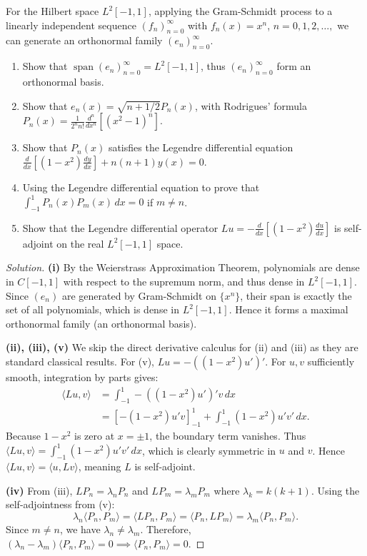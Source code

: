 \documentclass{article}
\begin{document}
	\begin{problem}
		For the Hilbert space $L^{2}[-1,1]$, applying the Gram-Schmidt process to a linearly independent sequence $(f_{n})_{n=0}^{\infty}$ with $f_{n}(x) = x^{n}$, $n=0,1,2,\dots,$ we can generate an orthonormal family $(e_{n})_{n=0}^{\infty}$.
		\begin{enumerate}
			\item[(i)] Show that $\operatorname{span}(e_{n})_{n=0}^{\infty} = L^{2}[-1,1]$, thus $(e_{n})_{n=0}^{\infty}$ form an orthonormal basis.
			\item[(ii)] Show that $e_{n}(x) = \sqrt{n + 1/2} P_{n}(x)$, with Rodrigues' formula $P_{n}(x) = \frac{1}{2^{n}n!} \frac{d^{n}}{dx^{n}} [(x^{2}-1)^{n}]$.
			\item[(iii)] Show that $P_{n}(x)$ satisfies the Legendre differential equation $\frac{d}{dx} \left[ (1-x^{2}) \frac{dy}{dx} \right] + n(n+1)y(x) = 0$.
			\item[(iv)] Using the Legendre differential equation to prove that $\int_{-1}^{1} P_{n}(x) P_{m}(x) \, dx = 0$ if $m \ne n$.
			\item[(v)] Show that the Legendre differential operator $L u = -\frac{d}{dx} \left[ (1-x^{2}) \frac{du}{dx} \right]$ is self-adjoint on the real $L^{2}[-1,1]$ space.
		\end{enumerate}
	\end{problem}
    \begin{proof}[Solution]
        \textbf{(i)} By the Weierstrass Approximation Theorem, polynomials are dense in $C[-1, 1]$ with respect to the supremum norm, and thus dense in $L^2[-1, 1]$. Since $(e_n)$ are generated by Gram-Schmidt on $\{x^n\}$, their span is exactly the set of all polynomials, which is dense in $L^2[-1, 1]$. Hence it forms a maximal orthonormal family (an orthonormal basis).
        
        \textbf{(ii), (iii), (v)} We skip the direct derivative calculus for (ii) and (iii) as they are standard classical results. For (v), $Lu = -((1-x^2)u')'$. For $u, v$ sufficiently smooth, integration by parts gives:
        \begin{align*}
            \langle Lu, v \rangle &= \int_{-1}^1 -((1-x^2)u')' v \, dx \\
            &= \left[ -(1-x^2)u'v \right]_{-1}^1 + \int_{-1}^1 (1-x^2)u'v' \, dx.
        \end{align*}
        Because $1-x^2$ is zero at $x = \pm 1$, the boundary term vanishes. Thus $\langle Lu, v \rangle = \int_{-1}^1 (1-x^2)u'v' \, dx$, which is clearly symmetric in $u$ and $v$. Hence $\langle Lu, v \rangle = \langle u, Lv \rangle$, meaning $L$ is self-adjoint.
        
        \textbf{(iv)} From (iii), $LP_n = \lambda_n P_n$ and $LP_m = \lambda_m P_m$ where $\lambda_k = k(k+1)$. Using the self-adjointness from (v):
        \[ \lambda_n \langle P_n, P_m \rangle = \langle LP_n, P_m \rangle = \langle P_n, LP_m \rangle = \lambda_m \langle P_n, P_m \rangle. \]
        Since $m \neq n$, we have $\lambda_n \neq \lambda_m$. Therefore, $(\lambda_n - \lambda_m)\langle P_n, P_m \rangle = 0 \implies \langle P_n, P_m \rangle = 0$.
    \end{proof}
\end{document}
